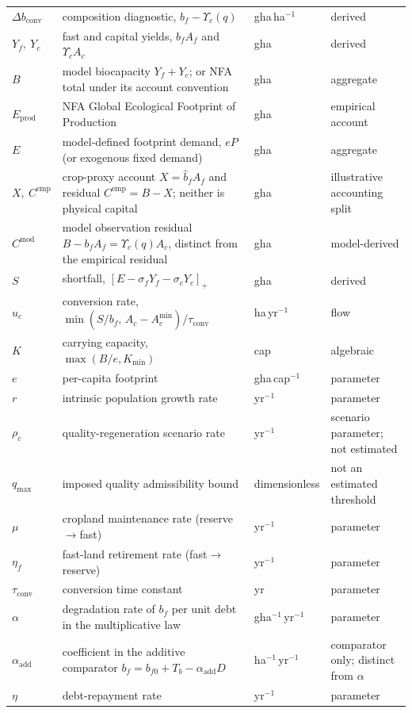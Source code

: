 \documentclass[11pt,a4paper]{article}
\newcommand{\pos}[1]{\left[#1\right]_+}
\newcommand{\dconv}{\Delta b_{\mathrm{conv}}}
\newcommand{\Ups}{\Upsilon_c}
\newcommand{\Acmin}{A_c^{\min}}
\newcommand{\tconv}{\tau_{\mathrm{conv}}}
\begin{document}
\begin{longtable}{>{\raggedright\arraybackslash}p{}>{\raggedright\arraybackslash}p{}>{\raggedright\arraybackslash}p{}>{\raggedright\arraybackslash}p{}}
$\dconv$ & composition diagnostic, $b_f-\Ups(q)$ & gha\,ha$^{-1}$ & derived \\
$Y_f,\ Y_c$ & fast and capital yields, $b_fA_f$ and $\Ups A_c$ & gha & derived \\
$B$ & model biocapacity $Y_f+Y_c$; or NFA total under its account convention & gha & aggregate \\
$E_{\mathrm{prod}}$ & NFA Global Ecological Footprint of Production & gha & empirical account \\
$E$ & model-defined footprint demand, $eP$ (or exogenous fixed demand) & gha & aggregate \\
$X,\ C^{\mathrm{emp}}$ & crop-proxy account $X=\hat b_fA_f$ and residual $C^{\mathrm{emp}}=B-X$; neither is physical capital & gha & illustrative accounting split \\
$C^{\mathrm{mod}}$ & model observation residual $B-b_fA_f=\Ups(q)A_c$, distinct from the empirical residual & gha & model-derived \\
$S$ & shortfall, $\pos{E-\sigma_fY_f-\sigma_cY_c}$ & gha & derived \\
$u_c$ & conversion rate, $\min(S/b_f,\,A_c-\Acmin)/\tconv$ & ha\,yr$^{-1}$ & flow \\
$K$ & carrying capacity, $\max(B/e,K_{\min})$ & cap & algebraic \\
$e$ & per-capita footprint & gha\,cap$^{-1}$ & parameter \\
$r$ & intrinsic population growth rate & yr$^{-1}$ & parameter \\
$\rho_c$ & quality-regeneration scenario rate & yr$^{-1}$ & scenario parameter; not estimated \\
$q_{\max}$ & imposed quality admissibility bound & dimensionless & not an estimated threshold \\
$\mu$ & cropland maintenance rate (reserve$\to$fast) & yr$^{-1}$ & parameter \\
$\eta_f$ & fast-land retirement rate (fast$\to$reserve) & yr$^{-1}$ & parameter \\
$\tconv$ & conversion time constant & yr & parameter \\
$\alpha$ & degradation rate of $b_f$ per unit debt in the multiplicative law & gha$^{-1}$\,yr$^{-1}$ & parameter \\
$\alpha_{\mathrm{add}}$ & coefficient in the additive comparator $b_f=b_{f0}+T_b-\alpha_{\mathrm{add}}D$ & ha$^{-1}$\,yr$^{-1}$ & comparator only; distinct from $\alpha$ \\
$\eta$ & debt-repayment rate & yr$^{-1}$ & parameter \\

\end{longtable}
\end{document}
